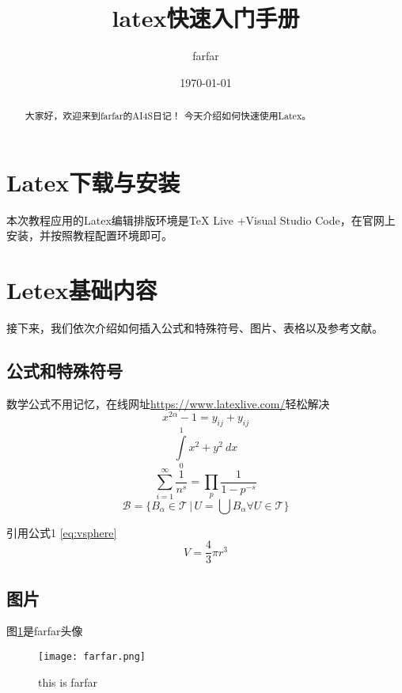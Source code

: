 \documentclass[UTF8]{article}%
\title{\heiti\zihao{2} latex快速入门手册}      %
\author{\songti farfar}                     %
\date{\today}                               %
\begin{document}
    \maketitle              %
    \thispagestyle{empty}   %

\begin{abstract}            
    大家好，欢迎来到farfar的AI4S日记！ 今天介绍如何快速使用Latex。
\end{abstract}

\tableofcontents

\section{Latex下载与安装}
本次教程应用的Latex编辑排版环境是TeX Live +Visual Studio Code，在官网上安装，并按照教程配置环境即可。

\section{Letex基础内容}
接下来，我们依次介绍如何插入公式和特殊符号、图片、表格以及参考文献。

\subsection{公式和特殊符号}
数学公式不用记忆，在线网址\url{https://www.latexlive.com/}轻松解决 
\[ x^{2 \alpha} - 1 = y_{ij} + y_{ij}  \]
\[ \int\limits_0^1 x^2 + y^2 \ dx \]
\[ \sum_{i=1}^{\infty} \frac{1}{n^s} = \prod_p \frac{1}{1 - p^{-s}} \]
\[\mathcal{B} = \{B_{\alpha} \in \mathcal{T}\, |\,  U = \bigcup B_{\alpha} \forall U \in \mathcal{T} \}\]

引用公式1 \ref{eq:vsphere}
   \begin{equation} %
     \label{eq:vsphere}
       V = \frac{4}{3}\pi r^3
       \end{equation}

\subsection{图片}
图\ref{Fig:1}是farfar头像
\begin{figure}[!h]                                  %
    \centering                                      %
    \texttt{[image: farfar.png]}        %
    \caption{this is farfar}                        %
    \label{Fig:1}                                   %
\end{figure}
\end{document}
